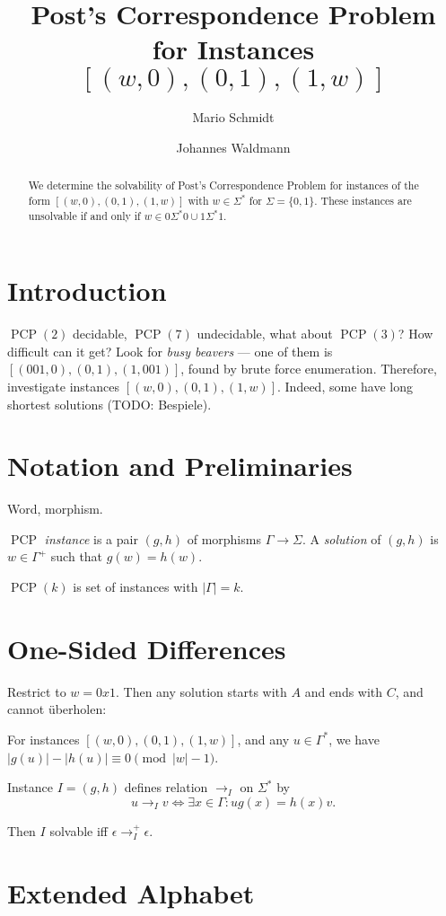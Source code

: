 \documentclass{llncs}
\author{Mario Schmidt \inst{1}
  \and 
  Johannes Waldmann \inst{2}
}
\institute{
  Universit\"at Leipzig
  \and
  HTWK Leipzig
}
\title{Post's Correspondence Problem \\
  for Instances $[(w,0),(0,1),(1,w)]$
}
\newcommand{\PCP}{\operatorname{PCP}}
\begin{document}
\maketitle

\begin{abstract}
  We determine the solvability of Post's Correspondence Problem
  for instances of the form  $[(w,0),(0,1),(1,w)]$ 
  with $w \in\Sigma^*$ for $\Sigma= \{0,1\}$.
  These instances are unsolvable 
  if and only if $w \in 0 \Sigma^* 0 \cup 1 \Sigma^* 1$.
\end{abstract}

\section{Introduction}

$\PCP(2)$ decidable, $\PCP(7)$ undecidable, what about $\PCP(3)$?
How difficult can it get? Look for \emph{busy beavers} ---
one of them is $[(001,0),(0,1),(1,001)]$, found by brute force enumeration.
Therefore, investigate instances  $[(w,0),(0,1),(1,w)]$.
Indeed, some have long shortest solutions (TODO: Bespiele).

\section{Notation and Preliminaries}

Word, morphism. 

$\PCP$ \emph{instance} is a pair $(g,h)$ of morphisms $\Gamma\to\Sigma$.
A \emph{solution} of  $(g,h)$ is $w\in\Gamma^+$ such that $g(w)=h(w)$.

$\PCP(k)$ is set of instances with $|\Gamma|=k$.

\section{One-Sided Differences}

Restrict to $w = 0x1$. Then any solution starts with $A$ and ends with $C$,
and cannot \"uberholen:

For instances  $[(w,0),(0,1),(1,w)]$,
and any $u\in\Gamma^*$, we have $|g(u)| - |h(u)| \equiv 0 \pmod{|w|-1}$.

Instance $I=(g,h)$ defines relation $\to_I$ on $\Sigma^*$ by
\[
   u \to_I v \iff \exists x\in\Gamma: u g(x) = h(x) v.
\]

Then $I$ solvable iff $\epsilon \to_I^+ \epsilon$.


\section{Extended Alphabet}
\end{document}
